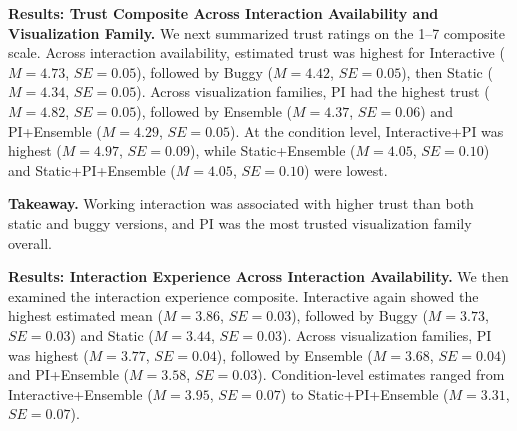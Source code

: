\noindent\textbf{Results: Trust Composite Across Interaction Availability and Visualization Family.}
We next summarized trust ratings on the 1--7 composite scale. Across interaction availability, estimated trust was highest for Interactive ($M=4.73$, $SE=0.05$), followed by Buggy ($M=4.42$, $SE=0.05$), then Static ($M=4.34$, $SE=0.05$). Across visualization families, PI had the highest trust ($M=4.82$, $SE=0.05$), followed by Ensemble ($M=4.37$, $SE=0.06$) and PI+Ensemble ($M=4.29$, $SE=0.05$). At the condition level, Interactive+PI was highest ($M=4.97$, $SE=0.09$), while Static+Ensemble ($M=4.05$, $SE=0.10$) and Static+PI+Ensemble ($M=4.05$, $SE=0.10$) were lowest.

\noindent\textbf{Takeaway.}
Working interaction was associated with higher trust than both static and buggy versions, and PI was the most trusted visualization family overall.

\noindent\textbf{Results: Interaction Experience Across Interaction Availability.}
We then examined the interaction experience composite. Interactive again showed the highest estimated mean ($M=3.86$, $SE=0.03$), followed by Buggy ($M=3.73$, $SE=0.03$) and Static ($M=3.44$, $SE=0.03$). Across visualization families, PI was highest ($M=3.77$, $SE=0.04$), followed by Ensemble ($M=3.68$, $SE=0.04$) and PI+Ensemble ($M=3.58$, $SE=0.03$). Condition-level estimates ranged from Interactive+Ensemble ($M=3.95$, $SE=0.07$) to Static+PI+Ensemble ($M=3.31$, $SE=0.07$).

